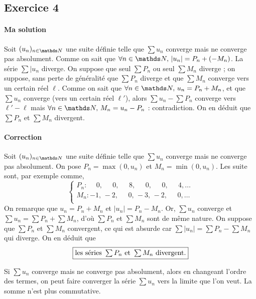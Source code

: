 \subsection{Exercice 4}

\paragraph{Ma solution}

Soit $(u_n)_{n\in\N}$\/ une suite définie telle que $\sum u_n$\/ converge mais ne converge pas absolument.
Comme on sait que $\forall n\in \N,\,|u_n| = P_n + (-M_n)$. La série $\sum |u_n$\/ diverge. On suppose que seul $\sum P_n$\/ ou seul $\sum M_n$\/ diverge ; on suppose, sans perte de généralité que $\sum P_n$\/ diverge et que $\sum M_n$\/ converge vers un certain réel $\ell$. Comme on sait que $\forall n \in \N,\,u_n = P_n + M_n$, et que $\sum u_n$\/ converge (vers un certain réel $\ell'$), alors $\sum u_n - \sum P_n$\/ converge vers $\ell' - \ell$\/ mais $\forall n \in \N,\,M_n = u_n - P_n$\/ : contradiction. On en déduit que $\sum P_n$\/ et $\sum M_n$\/ divergent.

\paragraph{Correction}

Soit $(u_n)_{n\in\N}$\/ une suite définie telle que $\sum u_n$\/ converge mais ne converge pas absolument. On pose $P_n = \max(0, u_n)$\/ et $M_n = \min(0, u_n)$. Les suite sont, par exemple comme, \[
	\begin{cases}
		P_n : \phantom{-}0,\,\phantom{-}0,\,\phantom{-}8,\,\phantom{-}0,\,\phantom{-}0,\,\phantom{-}4,\ldots\\
		M_n : -1,\,-2,\,\phantom{-}0,\,-3,\,-2,\,\phantom{-}0,\ldots\\
	\end{cases}
\] On remarque que $u_n = P_n + M_n$\/ et $|u_n| = P_n - M_n$. Or, $\sum u_n$\/ converge et $\sum u_n = \sum P_n + \sum M_n$, d'où $\sum P_n$\/ et $\sum M_n$\/ sont de même nature.
On suppose que $\sum P_n$\/ et $\sum M_n$\/ convergent, ce qui est absurde car $\sum |u_n| = \sum P_n - \sum M_n$\/ qui diverge. On en déduit que \[
	\boxed{\textstyle\text{les séries } \sum P_n \text{ et } \sum M_n \text{ divergent.}}
\]

Si $\sum u_n$\/ converge mais ne converge pas absolument, alors en changeant l'ordre des termes, on peut faire converger la série $\sum u_n$\/ vers la limite que l'on veut. La somme n'est plus commutative.

